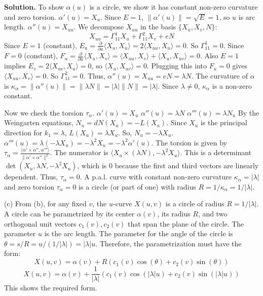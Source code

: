 \documentclass[12pt, a4paper, oneside]{article}
\newenvironment{solution}
  {\par\noindent\textbf{Solution. }\newline}
  {\par}
\begin{document}
\begin{solution}
To show $\alpha(u)$ is a circle, we show it has constant non-zero curvature and zero torsion.
$\alpha'(u) = X_u$. Since $E=1$, $\|\alpha'(u)\| = \sqrt{E} = 1$, so $u$ is arc length.
$\alpha''(u) = X_{uu}$. We decompose $X_{uu}$ in the basis $\{X_u, X_v, N\}$:
\[ X_{uu} = \Gamma_{11}^1 X_u + \Gamma_{11}^2 X_v + e N \]
Since $E=1$ (constant), $E_u = \frac{\partial}{\partial u}\langle X_u, X_u \rangle = 2\langle X_{uu}, X_u \rangle = 0$. So $\Gamma_{11}^1 = 0$.
Since $F=0$ (constant), $F_u = \frac{\partial}{\partial u}\langle X_u, X_v \rangle = \langle X_{uu}, X_v \rangle + \langle X_u, X_{uv} \rangle = 0$.
Also $E=1$ implies $E_v = 2\langle X_{uv}, X_u \rangle = 0$, so $\langle X_u, X_{uv} \rangle = 0$.
Plugging this into $F_u=0$ gives $\langle X_{uu}, X_v \rangle = 0$. So $\Gamma_{11}^2 = 0$.
Thus, $\alpha''(u) = X_{uu} = e N = \lambda N$.
The curvature of $\alpha$ is $\kappa_\alpha = \|\alpha''(u)\| = \|\lambda N\| = |\lambda|\|N\| = |\lambda|$.
Since $\lambda \ne 0$, $\kappa_\alpha$ is a non-zero constant.

Now we check the torsion $\tau_\alpha$.
$\alpha'(u) = X_u$
$\alpha''(u) = \lambda N$
$\alpha'''(u) = \lambda N_u$
By the Weingarten equations, $N_u = dN(X_u) = -L(X_u)$. Since $X_u$ is the principal direction for $k_1 = \lambda$, $L(X_u) = \lambda X_u$.
So, $N_u = - \lambda X_u$.
$\alpha'''(u) = \lambda(-\lambda X_u) = -\lambda^2 X_u = -\lambda^2 \alpha'(u)$.
The torsion is given by $\tau_\alpha = \frac{\langle \alpha' \times \alpha'', \alpha''' \rangle}{\|\alpha' \times \alpha''\|^2}$.
The numerator is $\langle X_u \times (\lambda N), -\lambda^2 X_u \rangle$. This is a determinant $\det(X_u, \lambda N, -\lambda^2 X_u)$, which is 0 because the first and third vectors are linearly dependent.
Thus, $\tau_\alpha = 0$.
A p.a.l. curve with constant non-zero curvature $\kappa_\alpha = |\lambda|$ and zero torsion $\tau_\alpha = 0$ is a circle (or part of one) with radius $R = 1/\kappa_\alpha = 1/|\lambda|$.

(c) From (b), for any fixed $v$, the $u$-curve $X(u,v)$ is a circle of radius $R = 1/|\lambda|$.
A circle can be parametrized by its center $\alpha(v)$, its radius $R$, and two orthogonal unit vectors $c_1(v), c_2(v)$ that span the plane of the circle.
The parameter $u$ is the arc length. The parameter for the angle of the circle is $\theta = s/R = u / (1/|\lambda|) = |\lambda|u$.
Therefore, the parametrization must have the form:
\[ X(u,v) = \alpha(v) + R(c_1(v) \cos(\theta) + c_2(v) \sin(\theta)) \]
\[ X(u,v) = \alpha(v) + \frac{1}{|\lambda|} (c_1(v) \cos(|\lambda|u) + c_2(v) \sin(|\lambda|u)) \text{} \]
This shows the required form.
\end{solution}
\end{document}
